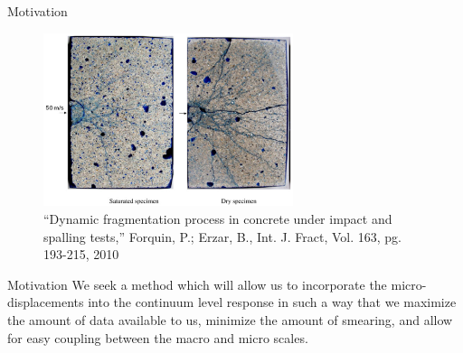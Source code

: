 \documentclass[11pt]{beamer}
\begin{document}
\begin{frame}{Motivation}

\begin{figure}
\centering
\includegraphics[width = 0.65\textwidth]{./images/impact_fracture.png}
\caption{“Dynamic fragmentation process in concrete under impact and spalling tests,” Forquin, P.; Erzar, B., Int. J. Fract, Vol. 163, pg. 193-215, 2010}
\end{figure}

\end{frame}

\begin{frame}{Motivation}
We seek a method which will allow us to incorporate the micro-displacements into the continuum level response in such a way that we maximize the amount of data available to us, minimize the amount of smearing, and allow for easy coupling between the macro and micro scales.
\end{frame}
\end{document}

